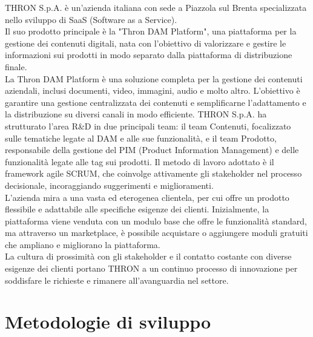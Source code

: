 THRON S.p.A. è un'azienda italiana  con sede a Piazzola sul Brenta specializzata nello sviluppo di SaaS (Software as a Service). \\
Il suo prodotto principale è la "Thron DAM Platform", una piattaforma per la gestione dei contenuti digitali, nata con l'obiettivo di valorizzare e gestire le informazioni sui prodotti in modo separato dalla piattaforma di distribuzione finale. \\
La Thron DAM Platform è una soluzione completa per la gestione dei contenuti aziendali, inclusi documenti, video, immagini, audio e molto altro. L'obiettivo è garantire una gestione centralizzata dei contenuti e semplificarne l'adattamento e 
la distribuzione su diversi canali in modo efficiente. 
THRON S.p.A. ha strutturato l'area R\&D in due principali team: il team Contenuti, focalizzato sulle tematiche legate al DAM e alle sue funzionalità, e il team Prodotto, responsabile della gestione del PIM (Product Information Management) 
e delle funzionalità legate alle tag sui prodotti. Il metodo di lavoro adottato è il framework agile SCRUM, che coinvolge attivamente gli stakeholder nel processo decisionale, incoraggiando suggerimenti e miglioramenti. \\
L'azienda mira a una vasta ed eterogenea clientela, per cui offre un prodotto flessibile e adattabile alle specifiche esigenze dei clienti. Inizialmente, la piattaforma viene venduta con un modulo base che offre le funzionalità standard, ma attraverso un marketplace, è 
possibile acquistare o aggiungere moduli gratuiti che ampliano e migliorano la piattaforma. \\
La cultura di prossimità con gli stakeholder e il contatto costante con diverse esigenze dei clienti portano THRON a un continuo processo di innovazione per soddisfare le richieste e rimanere all'avanguardia nel settore. \\

\section{Metodologie di sviluppo}

